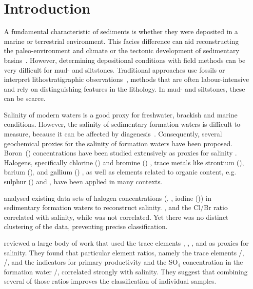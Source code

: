 \chapter{Introduction}

A fundamental characteristic of sediments is whether they were deposited
in a marine or terrestrial en\-vi\-ron\-ment. This facies difference can aid reconstructing
the paleo-environment and climate or the tectonic development of sedimentary 
basins~\parencite{ding-sr-climate-2001,kempf_lower_2005,schlunegger_possible_2007,wei-2020,yang-2006}.
However, determining depositional conditions with field methods can be very difficult for
mud- and siltstones.
Traditional approaches use fossils or interpret lithostratigraphic 
observations~\parencite{nichols-sedi-2023,schlunegger-sedi-2023}, methods that are often labour-intensive
and rely on distinguishing features in the lithology. In mud- and siltstones, these can be scarce.

Salinity of modern waters is a good proxy for freshwater, brackish and marine conditions. However,
the salinity of sedimentary formation waters is difficult to measure, because it can be affected by
diagenesis~\parencite{kharaka-2003}.
Consequently, several geochemical proxies for the salinity of formation waters have been proposed.
Boron~() concentrations have been studied extensively as proxies for salinity
\parencite{anovitz-grew-boron-2018, frederickson_geochemical_1960, harder-boron-1970}.
Halogens, specifically chlorine () and bromine () 
\parencite{malcolm_behaviour_1984, Worden_1996}, trace metals like strontium (), barium (),
and gallium () \parencite{banner-hanson-1990, bowen-sr-1956,wei-2020,ding-sr-climate-2001,yang-2006},
as well as elements related to organic content, e.g. sulphur () and \TOC 
\parencite{blattmann-2019, berner-raiswell-1983}, have been applied in many contexts.

\textcite{Worden_1996} analysed existing data sets of halogen concentrations 
(, , iodine ()) in
sedimentary formation waters to reconstruct salinity. ,  and the Cl/Br ratio
correlated with salinity, while  was not correlated. 
Yet there was no distinct clustering of the data, preventing precise classification.

\textcite{wei-2020} reviewed a large body of work that used the trace elements
, , , and  as proxies for salinity.
They found that particular element ratios, namely the trace elements 
/, /, and the indicators for primary productivity and the SO$_4$ 
concentration in the formation water /, 
correlated strongly with salinity. They suggest that 
combining several of those ratios improves the classification of individual samples.


